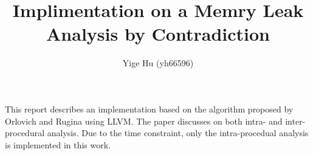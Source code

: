 \documentclass[12pt]{article}
\title{\bf \Large Implimentation on a Memry Leak Analysis by Contradiction}
\author{\normalsize Yige Hu (yh66596)}
\date{}
\newcommand{\llvm}[0]{LLVM\xspace}
\begin{document}
\maketitle


This report describes an implementation based on the algorithm proposed by
Orlovich and Rugina\cite{rugina} using \llvm. The paper discusses on both 
intra- and inter- procedural analysis. Due to the time constraint, only the
intra-procedual analysis is implemented in this work.

%

%

%

%
%
%


\footnotesize


\end{document}
